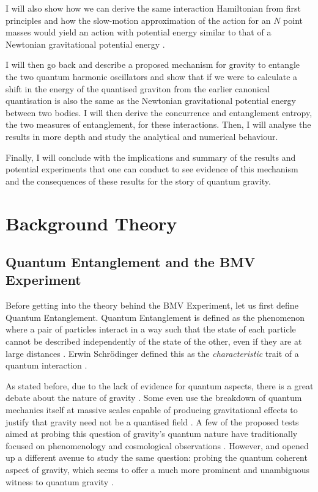 \documentclass[12pt,a4paper]{report}
\theoremstyle{plain}
\theoremstyle{definition}
\theoremstyle{remark}
\begin{document}
I will also show how we can derive the same interaction Hamiltonian from first principles and how the slow-motion approximation of the action for an $N$ point masses would yield an action with potential energy similar to that of a Newtonian gravitational potential energy \cite{Christodoulou_2023b}.

I will then go back and describe a proposed mechanism for gravity to entangle the two quantum harmonic oscillators and show that if we were to calculate a shift in the energy of the quantised graviton from the earlier canonical quantisation is also the same as the Newtonian gravitational potential energy between two bodies. I will then derive the concurrence \cite{Bose_2022} and entanglement entropy, the two measures of entanglement, for these interactions. Then, I will analyse the results in more depth and study the analytical and numerical behaviour.

Finally, I will conclude with the implications and summary of the results and potential experiments that one can conduct to see evidence of this mechanism and the consequences of these results for the story of quantum gravity.

\newpage
\chapter{Background Theory}
\section{Quantum Entanglement and the BMV Experiment}
Before getting into the theory behind the BMV Experiment, let us first define Quantum Entanglement. Quantum Entanglement is defined as the phenomenon where a pair of particles interact in a way such that the state of each particle cannot be described independently of the state of the other, even if they are at large distances \cite{schrodinger_1935}. Erwin Schr\"odinger defined this as the \textit{characteristic} trait of a quantum interaction \cite{schrodinger_1935}. 

As stated before, due to the lack of evidence for quantum aspects, there is a great debate about the nature of gravity \cite{Bose_2017, fdysongraviton}. Some even use the breakdown of quantum mechanics itself at massive scales capable of producing gravitational effects to justify that gravity need not be a quantised field \cite{penrose}. A few of the proposed tests aimed at probing this question of gravity's quantum nature have traditionally focused on phenomenology and cosmological observations \cite{Bose_2017, Hossenfelder_2012}. However, \citet{Bose_2017} and \citet{Marletto_2017} opened up a different avenue to study the same question: probing the quantum coherent aspect of gravity, which seems to offer a much more prominent and unambiguous witness to quantum gravity \cite{Bose_2017}.
\end{document}

